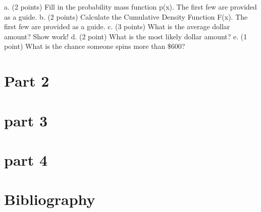 \documentclass[letterpaper, onecolumn,10pt]{IEEEtran}
\begin{document}
		 a. (2 points) Fill in the probability mass function p(x). The first few are provided as a guide.
b. (2 points) Calculate the Cumulative Density Function F(x). The first few are provided as a guide.
c. (3 points) What is the average dollar amount? Show work!
d. (2 point) What is the most likely dollar amount?
e. (1 point) What is the chance someone spins more than \$600?
		\fi
		\section{Part 2}

		
		\iffalse
Part 3. (6 points) Suppose a contestant spins the wheel three times.
a. (2 points) If spinning a “$0” is considered the event of interest, and each spin is independent of the other
spins, what common discrete distribution best models X the number of “$0” outcomes among 3 spins?
b. (2 points) How likely is it they spin $0 each time? Show work!
c. (2 points) How likely is it they spin $0 at least one time? Show work!
		\fi
		
		\section{part 3}
			
		
		\iffalse
		    Part 4: (6 points) The probabilities in Part 2 are based on probability theory aka “math”. Do these probabilities
stand up when a contestant actually spins the wheel? Go back to the Data Analysis #1 instructions page.
Download the R script titled: Wheel\_of\_Fortune\_Spin\_Script.R , open the file it will automatically open in R.
You need R software on the computer to open the script window. Follow the instructions in the code then
answer the following:
a. (1 point) What value did you spin?
b. (1 point) What is the average of the 1000 simulated spins? How different is this from the average you
calculated in part 2?
c. (1 point) Paste the probability mass function and the plot of the probability mass function from R.
d. (1 point) How different are the simulated probabilities to the theoretical probabilities in part 2?
e. (1 point) Based on the plot is the most likely outcome the same as it is in part 2?
f. (1 point) In general, what action will make the simulated values more like the theoretical ones? 
		\fi
		\section{part 4}
		
		
		\section{Bibliography}
		
		
\end{document}
